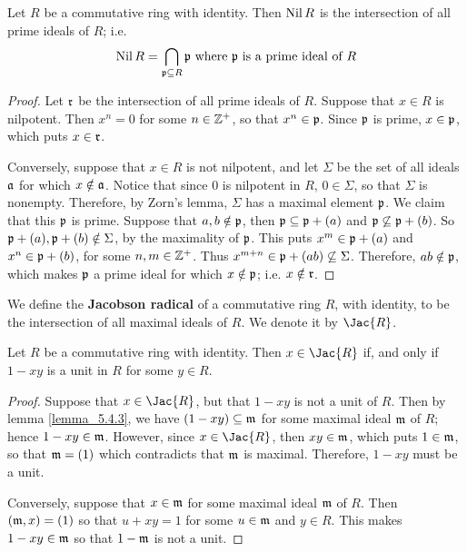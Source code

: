 \begin{lemma}\label{lemma_5.1.3}
    Let $R$ be a commutative ring with identity. Then $\operatorname{Nil}{R}$ is the
    intersection of all prime ideals of $R$; i.e.
    \begin{equation*}
        \operatorname{Nil}{R}=\bigcap_{\mathfrak{p} \subseteq R}{\mathfrak{p}} \text{ where } \mathfrak{p} \text{ is a
        prime ideal of } R
    \end{equation*}
\end{lemma}
\begin{proof}
    Let $\mathfrak{r}$ be the intersection of all prime ideals of $R$. Suppose that  $x
    \in R$ is nilpotent. Then $x^n=0$ for some $n \in \mathbb{Z}^+$, so that  $x^n \in
    \mathfrak{p}$. Since $\mathfrak{p}$ is prime, $x \in \mathfrak{p}$, which puts $x \in \mathfrak{r}$.

    Conversely, suppose that  $x \in R$ is not nilpotent, and let $\Sigma$ be
    the set of all ideals $\mathfrak{a}$ for which $x \notin \mathfrak{a}$. Notice that since $0$
    is nilpotent in $R$, $0 \in \Sigma$, so that $\Sigma$ is nonempty.
    Therefore, by Zorn's lemma, $\Sigma$ has a maximal element $\mathfrak{p}$. We claim
    that this $\mathfrak{p}$ is prime. Suppose that  $a,b \notin \mathfrak{p}$, then  $\mathfrak{p}
    \subseteq \mathfrak{p}+(a)$ and $\mathfrak{p} \not\subseteq \mathfrak{p}+(b)$. So $\mathfrak{p}+(a), \mathfrak{p}+(b)
    \notin \Sigma$, by the maximality of $\mathfrak{p}$. This puts  $x^m \in \mathfrak{p}+(a)$ and
    $x^n \in \mathfrak{p}+(b)$, for some $n,m \in \mathbb{Z}^+$. Thus  $x^{m+n} \in \mathfrak{p}+(ab)
    \not\subseteq \Sigma$. Therefore, $ab \notin \mathfrak{p}$, which makes $\mathfrak{p}$ a prime
    ideal for which $x \notin \mathfrak{p}$; i.e. $x \notin \mathfrak{r}$.
\end{proof}

\begin{definition}
    We define the \textbf{Jacobson radical} of a commutative ring $R$, with
    identity, to be the intersection of all maximal ideals of $R$. We denote it
    by  $\Jac{R}$.
\end{definition}

\begin{lemma}\label{lemma_5.5.4}
    Let $R$ be a commutative ring with identity. Then  $x \in \Jac{R}$ if, and
    only if $1-xy$ is a unit in $R$ for some $y \in R$.
\end{lemma}
\begin{proof}
    Suppose that $x \in \Jac{R}$, but that $1-xy$ is not a unit of $R$. Then by
    lemma \ref{lemma_5.4.3}, we have $(1-xy) \subseteq \mathfrak{m}$ for some maximal ideal
    $\mathfrak{m}$ of $R$; hence $1-xy \in \mathfrak{m}$. However, since $x \in \Jac{R}$, then $xy
    \in \mathfrak{m}$, which puts $1 \in \mathfrak{m}$, so that $\mathfrak{m}=(1)$ which contradicts that
    $\mathfrak{m}$ is maximal. Therefore,  $1-xy$ must be a unit.

    Conversely, suppose that  $x \in \mathfrak{m}$ for some maximal ideal $\mathfrak{m}$ of $R$.
    Then  $(\mathfrak{m},x)=(1)$ so that $u+xy=1$ for some  $u \in \mathfrak{m}$ and  $y \in R$.
    This makes  $1-xy \in \mathfrak{m}$ so that $1-\mathfrak{m}$ is not a unit.
\end{proof}


